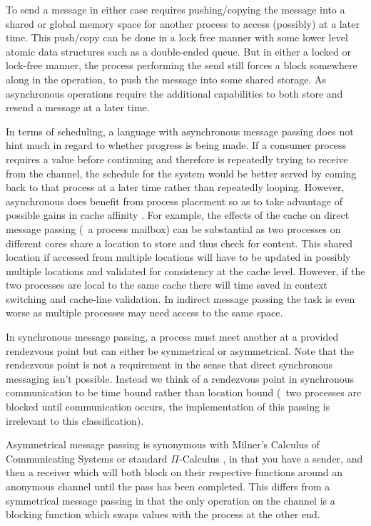 To send a message in either case requires pushing/copying the 
message into a shared or global memory space for another process to access 
(possibly) at a later time. This push/copy can be done in a lock free manner 
with some lower level atomic data structures such as a double-ended queue. But 
in either a locked or lock-free manner, the process performing the send still 
forces a block somewhere along in the operation, to push the message into some
shared storage. As asynchronous operations require the additional capabilities 
to both store and resend a message at a later time.

In terms of scheduling, a language with asynchronous message passing does not 
hint much in regard to whether progress is being made. If a consumer process
requires a value before continuing and therefore is repeatedly trying to receive 
from the channel, the schedule for the system would be better served by coming 
back to that process at a later time rather than repeatedly looping. However,
asynchronous does benefit from process placement so as to take advantage of 
possible gains in cache affinity \cite{debattista2002cache}. For example, the 
effects of the cache on direct message passing (\eg~a process mailbox) can be 
substantial as two processes on different cores share a location to store and
thus check for content. This shared location if accessed from multiple locations
will have to be updated in possibly multiple locations and validated for 
consistency at the cache level. However, if the two processes are local to the 
same cache there will time saved in context switching and cache-line validation. 
In indirect message passing the task is even worse as multiple processes may 
need access to the same space.

In synchronous message passing, a process must meet another at a provided 
rendezvous point but can either be symmetrical or asymmetrical. Note that the 
rendezvous point is not a requirement in the sense that direct synchronous 
messaging isn't possible. Instead we think of a rendezvous point in synchronous 
communication to be time bound rather than location bound (\ie~two processes are 
blocked until communication occurs, the implementation of this passing is 
irrelevant to this classification).

Asymmetrical message passing is synonymous with Milner's Calculus of 
Communicating Systems \cite{milner1982calculus} or standard $\Pi$-Calculus 
\cite{palamidessi1997comparing}, in that you have a sender, and then a receiver 
which will both block on their respective functions around an anonymous channel 
until the pass has been completed. This differs from a symmetrical message 
passing in that the only operation on the channel is a blocking function which 
swaps values with the process at the other end.

